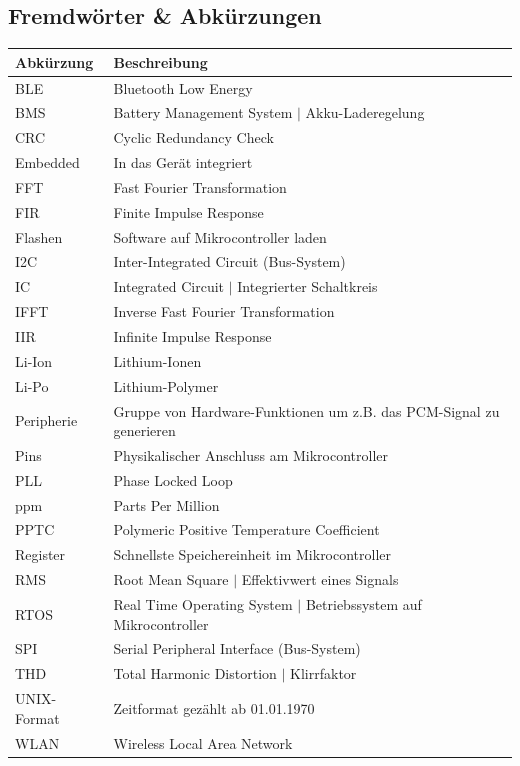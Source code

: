 \documentclass[12pt]{article}
\begin{document}
	\subsection{Fremdwörter \& Abkürzungen}
	\begin{table}[H]
		\centering
		\begin{tabular}{|l|p{}|}
			\hline
			\textbf{Abkürzung} & \textbf{Beschreibung} \\ \hline
			BLE & Bluetooth Low Energy \\ \hline
			BMS & Battery Management System $\vert$ Akku-Laderegelung \\ \hline
			CRC & Cyclic Redundancy Check \\ \hline
			Embedded & In das Gerät integriert \\ \hline
			FFT & Fast Fourier Transformation \\ \hline
			FIR & Finite Impulse Response \\ \hline
			Flashen & Software auf Mikrocontroller laden \\ \hline
			I2C & Inter-Integrated Circuit (Bus-System) \\ \hline
			IC & Integrated Circuit $\vert$ Integrierter Schaltkreis \\ \hline
			IFFT & Inverse Fast Fourier Transformation \\ \hline
			IIR & Infinite Impulse Response \\ \hline
			Li-Ion & Lithium-Ionen \\ \hline
			Li-Po & Lithium-Polymer \\ \hline
			Peripherie & Gruppe von Hardware-Funktionen um z.B. das PCM-Signal zu generieren \\ \hline
			Pins & Physikalischer Anschluss am Mikrocontroller \\ \hline
			PLL & Phase Locked Loop \\ \hline
			ppm & Parts Per Million \\ \hline
			PPTC & Polymeric Positive Temperature Coefficient \\ \hline
			Register & Schnellste Speichereinheit im Mikrocontroller \\ \hline
			RMS & Root Mean Square $\vert$ Effektivwert eines Signals \\ \hline
			RTOS & Real Time Operating System $\vert$ Betriebssystem auf Mikro\-controller \\ \hline
			SPI & Serial Peripheral Interface (Bus-System) \\ \hline
			THD & Total Harmonic Distortion $\vert$ Klirrfaktor \\ \hline
			UNIX-Format & Zeitformat gezählt ab 01.01.1970 \\ \hline
			WLAN & Wireless Local Area Network \\ \hline
		\end{tabular}
	\end{table}
	
\end{document}
